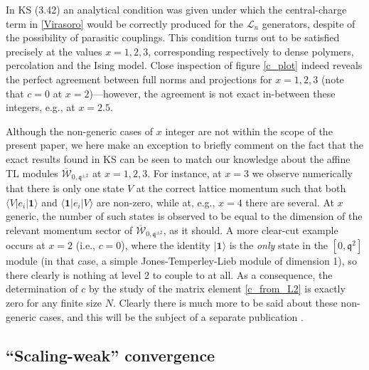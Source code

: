 \documentclass[a4paper,10pt]{article}
\newcommand{\q}{\mathfrak{q}}
\newcommand{\linnea}[1]{$\framebox{\tiny L}$\ \textbf{\texttt{{\color{red}\footnotesize#1}}}}
\newcommand{\bAStTL}[2]{\overline{\mathcal{W}}_{#1,#2}}
\begin{document}
In KS (3.42) an analytical condition was given under which the central-charge term in \eqref{Virasoro} would be correctly produced for the ${\mathcal L}_n$ generators, despite of the possibility of parasitic couplings. This condition turns out to be satisfied precisely at the values $x=1,2,3$, corresponding respectively to dense polymers, percolation and the Ising model. Close inspection of figure \ref{c_plot} indeed reveals the perfect agreement between full norms and projections 
for $x=1,2,3$ (note that $c=0$ at $x=2$)---however, the agreement is not exact in-between these integers, e.g., at $x=2.5$.

Although the non-generic cases of $x$ integer are not within the scope of the present paper, we here make an exception to briefly comment on the fact that the exact results found in KS can be seen to match our knowledge about the affine TL modules $\bAStTL{0}{\q^{\pm 2}}$ at $x=1,2,3$. For instance, at $x=3$ we observe numerically that there is only one state $V$ at the correct lattice momentum such that both $\langle V|e_i| \mathbf{1} \rangle$ and $\langle \mathbf{1} |e_i|V\rangle$ are non-zero, while at, e.g., $x=4$ there are several. At $x$ generic, the number of such states is observed to be equal to the dimension of the relevant momentum sector of $\bAStTL{0}{\q^{\pm 2}}$, as it should. A more clear-cut example occurs at $x=2$ (i.e., $c=0$), where the identity $| \mathbf{1} \rangle$ is the \emph{only} state in the $[0,\q^2]$ module (in that case, a simple Jones-Temperley-Lieb module of dimension 1), so there clearly is nothing at level 2 to couple to at all. As a consequence, the determination of $c$ by the study of the matrix element \eqref{c_from_L2} is exactly zero for any finite size $N$. Clearly there is much more to be said about these non-generic cases, and this will be the subject of a separate publication \cite{fullynongenericpaper}.


\subsection{``Scaling-weak'' convergence}\label{scaling_weak}
\end{document}
